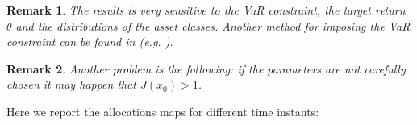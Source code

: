 \documentclass[]{article}
\newtheorem{remark}{Remark}
\begin{document}
\begin{remark}
	The results is very sensitive to the VaR constraint, the target return $\theta$ and the distributions of the asset classes. Another method for imposing the VaR constraint can be found in (e.g. \cite{Lue13}). 
\end{remark}
\begin{remark}
	Another problem is the following: if the parameters are not carefully chosen it may happen that $J(x_0) > 1 $.
\end{remark}
Here we report the allocations maps for different time instants:
\begin{figure}[H]
	\\
	 \\

\end{figure}
\end{document}
